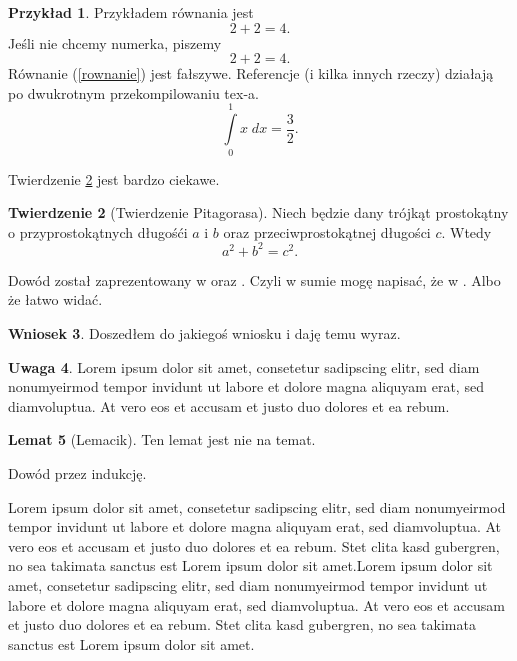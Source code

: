 \documentclass[a4paper,11pt,twoside]{report}
\makeatletter
\theoremstyle{definition}
\newtheorem{theorem}{Twierdzenie}[chapter]
\newtheorem{lemma}[theorem]{Lemat}
\newtheorem{example}[theorem]{Przykład}
\newtheorem{corollary}[theorem]{Wniosek}
\newtheorem{remark}[theorem]{Uwaga}
\renewenvironment{proof}[1][\proofname]
{\par
  \vspace{-12pt}%
  \pushQED{\qed}%
  \normalfont
  \topsep0pt \partopsep0pt %
  \trivlist
  \item[\hskip\labelsep
        \sc
    #1\@addpunct{:}]\ignorespaces
}
{%
  \popQED\endtrivlist\@endpefalse
  \addvspace{20pt} %
}
\makeatother
\begin{document}
\begin{example}
Przykładem równania jest
\begin{equation}
2+2=4.
\end{equation}
Jeśli nie chcemy numerka, piszemy
\begin{equation*}
2+2=4.
\end{equation*}
Równanie (\ref{rownanie}) jest fałszywe. Referencje (i kilka innych rzeczy) działają po dwukrotnym przekompilowaniu tex-a.
\begin{equation}\label{rownanie}
\int \limits_{0}^{1} x \; dx = \frac{3}{2}.
\end{equation}

\end{example}

Twierdzenie \ref{Pitagoras} jest bardzo ciekawe.

\begin{theorem}[Twierdzenie Pitagorasa]\label{Pitagoras}
Niech będzie dany trójkąt prostokątny o przyprostokątnych długośći $a$ i $b$ oraz przeciwprostokątnej długości $c$. Wtedy
$$
a^2 + b^2 = c^2.
$$
\end{theorem}

\begin{proof}
Dowód został zaprezentowany w \cite{Ktos} oraz \cite{Innyktos}. Czyli w sumie mogę napisać, że w \cite{Ktos, Innyktos}. Albo że łatwo widać.
\end{proof}

\begin{corollary}
Doszedłem do jakiegoś wniosku i daję temu wyraz.
\end{corollary}




\begin{remark}
Lorem ipsum dolor sit amet, consetetur sadipscing elitr, sed diam nonumyeirmod tempor invidunt ut labore et dolore magna aliquyam erat, sed diamvoluptua. At vero eos et accusam et justo duo dolores et ea rebum.
\end{remark}

\begin{lemma}[Lemacik]
Ten lemat jest nie na temat.
\end{lemma}
\begin{proof} Dowód przez indukcję.
\end{proof}


Lorem ipsum dolor sit amet, consetetur sadipscing elitr, sed diam nonumyeirmod tempor invidunt ut labore et dolore magna aliquyam erat, sed diamvoluptua. At vero eos et accusam et justo duo dolores et ea rebum. Stet clita kasd gubergren, no sea takimata sanctus est Lorem ipsum dolor sit amet.Lorem ipsum dolor sit amet, consetetur sadipscing elitr, sed diam nonumyeirmod tempor invidunt ut labore et dolore magna aliquyam erat, sed diamvoluptua. At vero eos et accusam et justo duo dolores et ea rebum. Stet clita kasd gubergren, no sea takimata sanctus est Lorem ipsum dolor sit amet.
\end{document}
